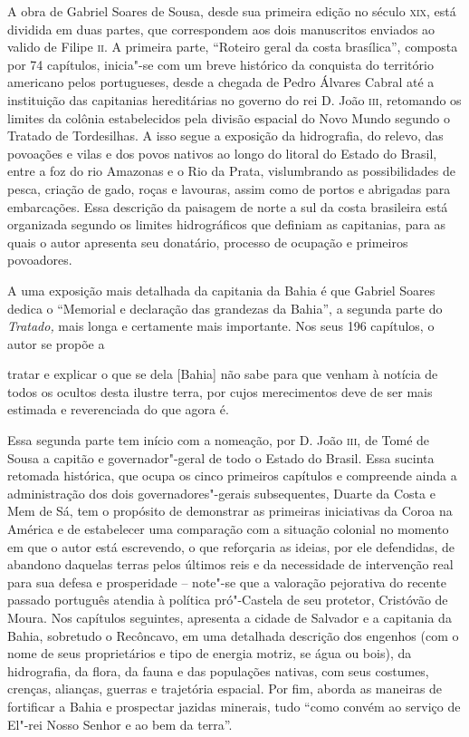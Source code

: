 A obra de Gabriel Soares de Sousa, desde sua primeira edição no século
\textsc{xix}, está dividida em duas partes, que correspondem aos dois
manuscritos enviados ao valido de Filipe \textsc{ii}. A primeira parte,
“Roteiro geral da costa brasílica”, composta por 74
capítulos, inicia"-se com um breve histórico da conquista do território
americano pelos portugueses, desde a chegada de Pedro Álvares Cabral
até a instituição das capitanias hereditárias no governo do rei D. João
\textsc{iii}, retomando os limites da colônia estabelecidos pela divisão
espacial do Novo Mundo segundo o Tratado de Tordesilhas. A isso segue a
exposição da hidrografia, do relevo, das povoações e vilas e dos povos
nativos ao longo do litoral do Estado do Brasil, entre a foz do rio
Amazonas e o Rio da Prata, vislumbrando as possibilidades de pesca,
criação de gado, roças e lavouras, assim como de portos e abrigadas
para embarcações. Essa descrição da paisagem de norte a sul da costa
brasileira está organizada segundo os limites hidrográficos que
definiam as capitanias, para as quais o autor apresenta seu donatário,
processo de ocupação e primeiros povoadores.

A uma exposição mais detalhada da capitania da Bahia é que Gabriel
Soares dedica o “Memorial e declaração das grandezas da Bahia”, a
segunda parte do \textit{Tratado,} mais longa e certamente mais
importante. Nos seus 196 capítulos, o autor se
propõe a
\begin{hedraquote}
tratar e explicar o que se dela [Bahia] não sabe para que venham à
notícia de todos os ocultos desta ilustre terra, por cujos merecimentos
deve de ser mais estimada e reverenciada do que agora é.
\end{hedraquote}

Essa segunda parte tem início com a nomeação, por D. João \textsc{iii}, de Tomé
de Sousa a capitão e governador"-geral de todo o Estado do
Brasil. Essa sucinta retomada histórica, que ocupa os cinco
primeiros capítulos e compreende ainda a administração dos dois
governadores"-gerais subsequentes, Duarte da Costa e Mem de Sá, tem o
propósito de demonstrar as primeiras iniciativas da Coroa na América e
de estabelecer uma comparação com a situação colonial no momento em que
o autor está escrevendo, o que reforçaria as ideias, por ele
defendidas, de abandono daquelas terras pelos últimos reis e da
necessidade de intervenção real para sua defesa e prosperidade –
note"-se que a valoração pejorativa do recente passado português atendia
à política pró"-Castela de seu protetor, Cristóvão de Moura.  Nos
capítulos seguintes, apresenta a cidade de Salvador e a capitania da
Bahia, sobretudo o Recôncavo, em uma detalhada descrição dos engenhos
(com o nome de seus proprietários e tipo de energia motriz, se água ou
bois), da hidrografia, da flora, da fauna e das populações nativas, com
seus costumes, crenças, alianças, guerras e trajetória espacial. Por
fim, aborda as maneiras de fortificar a Bahia e prospectar jazidas
minerais, tudo “como convém ao serviço de El"-rei Nosso Senhor e ao bem da terra”.

